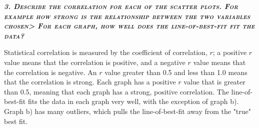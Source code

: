 \documentclass{article}
\begin{document}
\textbf{\emph{\textsc{3. Describe the correlation for each of the scatter plots. For example how strong is the relationship between the two variables chosen> For each graph, how well does the line-of-best-fit fit the data?}}}

Statistical correlation is measured by the coefficient of correlation, $r$; a positive $r$ value means that the correlation is positive, and a negative $r$ value means that the correlation is negative. An $r$ value greater than 0.5 and less than 1.0 means that the correlation is strong. Each graph has a positive $r$ value that is greater than 0.5, meaning that each graph has a strong, positive correlation. The line-of-best-fit fits the data in each graph very well, with the exception of graph b). Graph b) has many outliers, which pulls the line-of-best-fit away from the "true" best fit.
\end{document}
